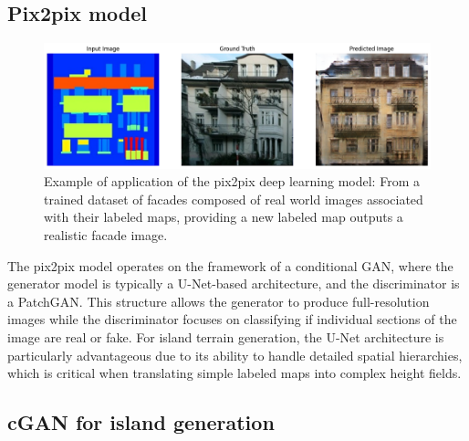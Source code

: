\subsection{Pix2pix model}

\begin{figure}[H]
	\centering
	\includegraphics[width = 0.8 \linewidth]{example_pix2pix_facade.png}
    \caption{Example of application of the pix2pix deep learning model: From a trained dataset of facades composed of real world images associated with their labeled maps, providing a new labeled map outputs a realistic facade image. }
    \label{fig:coral-island_pix2pix-example}
\end{figure}

The pix2pix model operates on the framework of a conditional GAN, where the generator model is typically a U-Net-based architecture, and the discriminator is a PatchGAN. This structure allows the generator to produce full-resolution images while the discriminator focuses on classifying if individual sections of the image are real or fake. For island terrain generation, the U-Net architecture is particularly advantageous due to its ability to handle detailed spatial hierarchies, which is critical when translating simple labeled maps into complex height fields. 


\subsection{cGAN for island generation}

